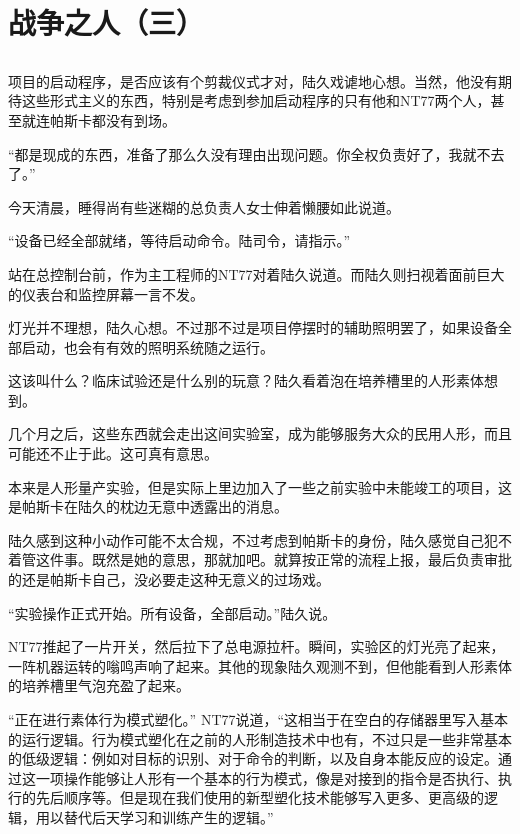 \chapter{战争之人（三）}

\section*{}

项目的启动程序，是否应该有个剪裁仪式才对，陆久戏谑地心想。当然，他没有期待这些形式主义的东西，特别是考虑到参加启动程序的只有他和NT77两个人，甚至就连帕斯卡都没有到场。

“都是现成的东西，准备了那么久没有理由出现问题。你全权负责好了，我就不去了。”

今天清晨，睡得尚有些迷糊的总负责人女士伸着懒腰如此说道。

“设备已经全部就绪，等待启动命令。陆司令，请指示。”

站在总控制台前，作为主工程师的NT77对着陆久说道。而陆久则扫视着面前巨大的仪表台和监控屏幕一言不发。

灯光并不理想，陆久心想。不过那不过是项目停摆时的辅助照明罢了，如果设备全部启动，也会有有效的照明系统随之运行。

这该叫什么？临床试验还是什么别的玩意？陆久看着泡在培养槽里的人形素体想到。

几个月之后，这些东西就会走出这间实验室，成为能够服务大众的民用人形，而且可能还不止于此。这可真有意思。

本来是人形量产实验，但是实际上里边加入了一些之前实验中未能竣工的项目，这是帕斯卡在陆久的枕边无意中透露出的消息。

陆久感到这种小动作可能不太合规，不过考虑到帕斯卡的身份，陆久感觉自己犯不着管这件事。既然是她的意思，那就加吧。就算按正常的流程上报，最后负责审批的还是帕斯卡自己，没必要走这种无意义的过场戏。

“实验操作正式开始。所有设备，全部启动。”陆久说。

NT77推起了一片开关，然后拉下了总电源拉杆。瞬间，实验区的灯光亮了起来，一阵机器运转的嗡鸣声响了起来。其他的现象陆久观测不到，但他能看到人形素体的培养槽里气泡充盈了起来。

“正在进行素体行为模式塑化。” NT77说道，“这相当于在空白的存储器里写入基本的运行逻辑。行为模式塑化在之前的人形制造技术中也有，不过只是一些非常基本的低级逻辑：例如对目标的识别、对于命令的判断，以及自身本能反应的设定。通过这一项操作能够让人形有一个基本的行为模式，像是对接到的指令是否执行、执行的先后顺序等。但是现在我们使用的新型塑化技术能够写入更多、更高级的逻辑，用以替代后天学习和训练产生的逻辑。”

